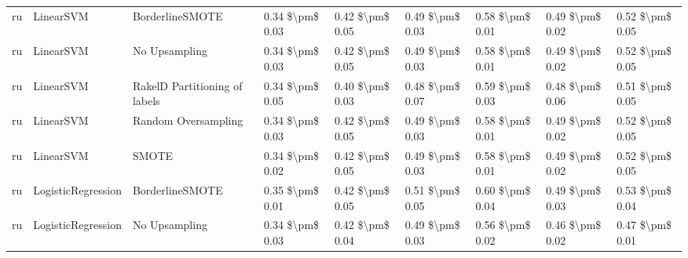 \begin{tabular}{lllllllll}
      ru &                       LinearSVM &               BorderlineSMOTE & 0.34 \$\textbackslash pm\$ 0.03 &           0.42 \$\textbackslash pm\$ 0.05 &       0.49 \$\textbackslash pm\$ 0.03 &        0.58 \$\textbackslash pm\$ 0.01 &                         0.49 \$\textbackslash pm\$ 0.02 &     0.52 \$\textbackslash pm\$ 0.05 \\
      ru &                       LinearSVM &                 No Upsampling & 0.34 \$\textbackslash pm\$ 0.03 &           0.42 \$\textbackslash pm\$ 0.05 &       0.49 \$\textbackslash pm\$ 0.03 &        0.58 \$\textbackslash pm\$ 0.01 &                         0.49 \$\textbackslash pm\$ 0.02 &     0.52 \$\textbackslash pm\$ 0.05 \\
      ru &                       LinearSVM & RakelD Partitioning of labels & 0.34 \$\textbackslash pm\$ 0.05 &           0.40 \$\textbackslash pm\$ 0.03 &       0.48 \$\textbackslash pm\$ 0.07 &        0.59 \$\textbackslash pm\$ 0.03 &                         0.48 \$\textbackslash pm\$ 0.06 &     0.51 \$\textbackslash pm\$ 0.05 \\
      ru &                       LinearSVM &           Random Oversampling & 0.34 \$\textbackslash pm\$ 0.03 &           0.42 \$\textbackslash pm\$ 0.05 &       0.49 \$\textbackslash pm\$ 0.03 &        0.58 \$\textbackslash pm\$ 0.01 &                         0.49 \$\textbackslash pm\$ 0.02 &     0.52 \$\textbackslash pm\$ 0.05 \\
      ru &                       LinearSVM &                         SMOTE & 0.34 \$\textbackslash pm\$ 0.02 &           0.42 \$\textbackslash pm\$ 0.05 &       0.49 \$\textbackslash pm\$ 0.03 &        0.58 \$\textbackslash pm\$ 0.01 &                         0.49 \$\textbackslash pm\$ 0.02 &     0.52 \$\textbackslash pm\$ 0.05 \\
      ru &              LogisticRegression &               BorderlineSMOTE & 0.35 \$\textbackslash pm\$ 0.01 &           0.42 \$\textbackslash pm\$ 0.05 &       0.51 \$\textbackslash pm\$ 0.05 &        0.60 \$\textbackslash pm\$ 0.04 &                         0.49 \$\textbackslash pm\$ 0.03 &     0.53 \$\textbackslash pm\$ 0.04 \\
      ru &              LogisticRegression &                 No Upsampling & 0.34 \$\textbackslash pm\$ 0.03 &           0.42 \$\textbackslash pm\$ 0.04 &       0.49 \$\textbackslash pm\$ 0.03 &        0.56 \$\textbackslash pm\$ 0.02 &                         0.46 \$\textbackslash pm\$ 0.02 &     0.47 \$\textbackslash pm\$ 0.01 \\

\end{tabular}
